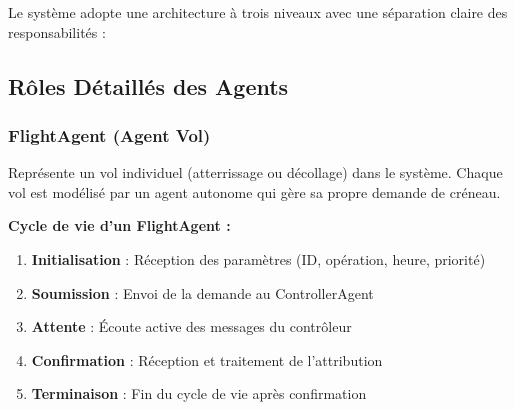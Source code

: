 \documentclass[12pt,a4paper]{article}
\begin{document}
Le système adopte une architecture à trois niveaux avec une séparation claire des responsabilités :

\begin{center}
\end{center}

\subsection{Rôles Détaillés des Agents}

\subsubsection{FlightAgent (Agent Vol)}

\begin{tcolorbox}[colback=lightblue!15, colframe=primaryblue, title=\textbf{Rôle et Responsabilités}]
Représente un vol individuel (atterrissage ou décollage) dans le système. Chaque vol est modélisé par un agent autonome qui gère sa propre demande de créneau.
\end{tcolorbox}

\textbf{Cycle de vie d'un FlightAgent :}

\begin{enumerate}[leftmargin=*]
    \item \textbf{Initialisation} : Réception des paramètres (ID, opération, heure, priorité)
    \item \textbf{Soumission} : Envoi de la demande au ControllerAgent
    \item \textbf{Attente} : Écoute active des messages du contrôleur
    \item \textbf{Confirmation} : Réception et traitement de l'attribution
    \item \textbf{Terminaison} : Fin du cycle de vie après confirmation
\end{enumerate}
\end{document}
